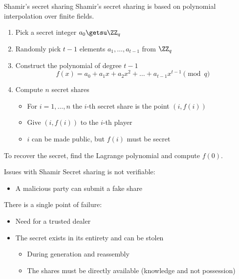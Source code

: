 \begin{frame}{Shamir's secret sharing}
  Shamir's secret sharing is based on polynomial interpolation over finite fields.
  \begin{enumerate}[<+(1)->]
    \item Pick a secret integer $a_0 \getsu \ZZ_q$
    \item Randomly pick $t-1$ elements $a_1, \dots, a_{t-1}$ from $\ZZ_q$
    \item Construct the polynomial of degree $t-1$
    \[
      f(x) = a_0 + a_1 x + a_2 x^2 + \dots + a_{t-1} x^{t-1} \pmod{q}
    \]
    \item Compute $n$ secret shares
    \begin{itemize}
      \item For $i=1, \dots, n$ the $i$-th secret share is the point $(i, f(i))$
      \item Give $(i, f(i))$ to the $i$-th player
      \item $i$ can be made public, but $f(i)$ must be secret
    \end{itemize}
  \end{enumerate}

  \pause
  To recover the secret, find the Lagrange polynomial and compute $f(0)$.
\end{frame}

\begin{frame}{Issues with Shamir}
  Secret sharing is not verifiable:
  \begin{itemize}[<+(1)->]
    \item A malicious party can submit a fake share
  \end{itemize}

  \pause
  There is a single point of failure:
  \begin{itemize}[<+(1)->]
    \item Need for a trusted dealer
    \item The secret exists in its entirety and can be stolen
    \begin{itemize}
      \item During generation and reassembly
      \item The shares must be directly available (knowledge and not possession)
    \end{itemize}
  \end{itemize}
\end{frame}

